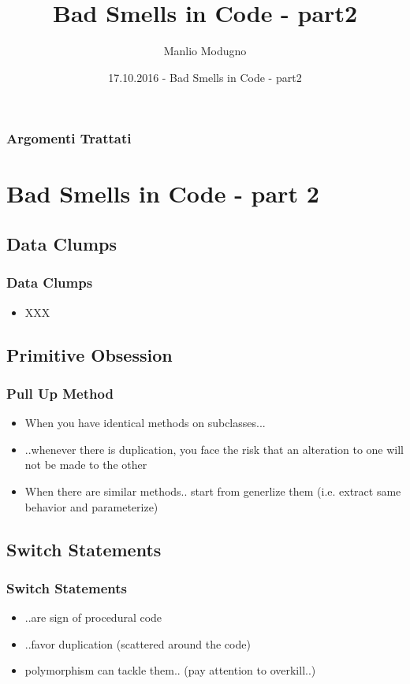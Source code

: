 \documentclass{beamer}
\title{Bad Smells in Code - part2}
\author{Manlio Modugno}
\institute[GMTechnologies]
\date[17.10.2016] 
{17.10.2016 - Bad Smells in Code - part2}
\begin{document}
\begin{frame}
  \titlepage
\end{frame}

\begin{frame}
  \frametitle{Argomenti Trattati}
  \tableofcontents
\end{frame}

\section{Bad Smells in Code - part 2}
\subsection{Data Clumps}
\begin{frame}
  \frametitle{Data Clumps}
  \begin{itemize}
	\item<+-> XXX
  \end{itemize}
\end{frame}

\subsection{Primitive Obsession}
\begin{frame}
  \frametitle{Pull Up Method}
  \begin{itemize}
	\item<+-> When you have identical methods on subclasses...
	\item<+-> ..whenever there is duplication, you face the risk that an alteration to one will not be made to the other
	\item<+-> When there are similar methods.. start from generlize them (i.e. extract same behavior and parameterize)
  \end{itemize}
\end{frame}

\subsection{Switch Statements}
\begin{frame}
  \frametitle{Switch Statements}
  \begin{itemize}
	\item<+-> ..are sign of procedural code
	\item<+-> ..favor duplication (scattered around the code)
	\item<+-> polymorphism can tackle them.. (pay attention to overkill..)
  \end{itemize}
\end{frame}
\end{document}
